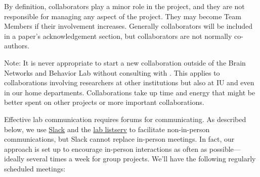 \documentclass{tufte-book} %
\begin{document}
\begin{enumerate}
\begin{enumerate}
\end{enumerate}
By definition, collaborators play a minor role in the project, and they are not responsible for managing any aspect of the project. They may become Team Members if their involvement increases. Generally collaborators will be included in a paper's acknowledgement section, but collaborators are not normally co-authors.

Note: It is never appropriate to start a new collaboration outside of the Brain Networks and Behavior Lab without consulting with \director. This applies to collaborations involving researchers at other institutions but also at IU and even in our home departments. Collaborations take up time and energy that might be better spent on other projects or more important collaborations.
\end{enumerate}



\noindent Effective lab communication requires forums for communicating. As described below, we use \href{http://www.slack.com}{Slack} and the \href{bnbl-l-subscribe@list.indiana.edu}{lab listserv} to facilitate non-in-person communications, but Slack cannot replace in-person meetings. In fact, our approach is set up to encourage in-person interactions as often as possible---ideally several times a week for group projects. We'll have the following regularly scheduled meetings:
\end{document}
